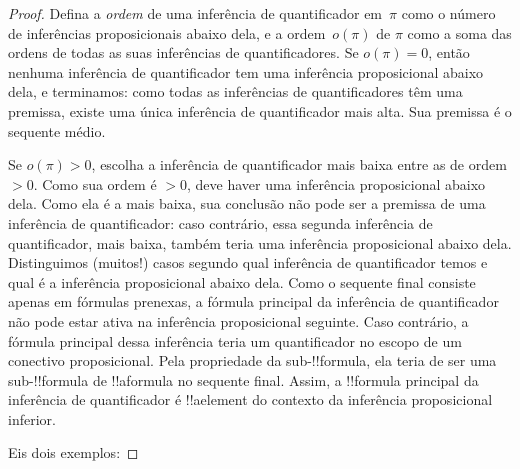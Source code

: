 \documentclass[../../../include/open-logic-section]{subfiles}
\begin{document}
\begin{proof}
  Defina a \emph{ordem} de uma inferência de quantificador em~$\pi$ como o
  número de inferências proposicionais abaixo dela, e a ordem~$o(\pi)$
  de $\pi$ como a soma das ordens de todas as suas inferências de quantificadores.
  Se $o(\pi) = 0$, então nenhuma inferência de quantificador tem uma inferência
  proposicional abaixo dela, e terminamos: como todas as inferências de quantificadores
  têm uma premissa, existe uma única inferência de quantificador mais alta.
  Sua premissa é o sequente médio.

  Se $o(\pi) > 0$, escolha a inferência de quantificador mais baixa entre as de ordem
  $>0$. Como sua ordem é $>0$, deve haver uma inferência proposicional
  abaixo dela. Como ela é a mais baixa, sua conclusão
  não pode ser a premissa de uma inferência de quantificador: caso contrário, essa segunda
  inferência de quantificador, mais baixa, também teria uma inferência proposicional abaixo
  dela. Distinguimos (muitos!) casos segundo qual inferência de quantificador
  temos e qual é a inferência proposicional abaixo dela.
  Como o sequente final consiste apenas em fórmulas prenexas, a
  fórmula principal da inferência de quantificador não pode estar ativa na
  inferência proposicional seguinte. Caso contrário, a fórmula principal
  dessa inferência teria um quantificador no escopo de um
  conectivo proposicional. Pela propriedade da sub-!!{formula}, ela teria
  de ser uma sub-!!{formula} de !!a{formula} no sequente final.
  Assim, a !!{formula} principal da inferência de quantificador é
  !!a{element} do contexto da inferência proposicional inferior.

  Eis dois exemplos:


\end{proof}
\end{document}
